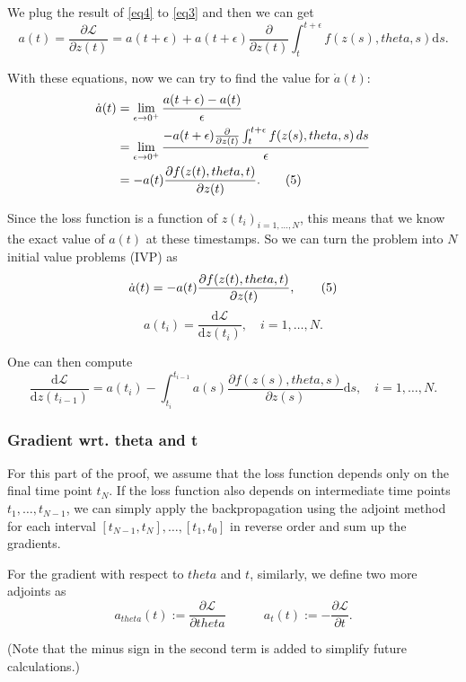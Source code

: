 \documentclass[a4paper,11pt,titlepage]{article}
\def\({}%
\def\){}%
\def\theta{theta}%
\theoremstyle{definition}
\theoremstyle{plain}
\theoremstyle{remark}
\begin{document}
We plug the result of \ref{eq4} to \ref{eq3} and then we can get
$$
a(t)=\frac{\partial \mathcal{L}}{\partial z(t)} = a(t+\epsilon)+a(t+\epsilon)\frac{\partial}{\partial z(t)}\int_{t}^{t+\epsilon}f(z(s),\theta,s)\mathrm{d}s.
$$

With these equations, now we can try to find the value for $\dot{a}(t)$:
\begin{align}
\dot{a}(t) &= \lim_{\epsilon \to 0^{+}}\frac{a(t+\epsilon)-a(t)}{\epsilon}\notag\\
&=\lim_{\epsilon \to 0^{+}}\frac{-a(t+\epsilon)\frac{\partial}{\partial z(t)}\int_{t}^{t+\epsilon}f(z(s),\theta,s)\,ds}{\epsilon}\notag\\
&=-a(t)\frac{\partial f(z(t),\theta,t)}{\partial z(t)}.\tag{5}
\end{align}

Since the loss function is a function of $z(t_i)_{i=1,\dots,N}$, this means that we know the exact value of $a(t)$ at these timestamps. So we can turn the problem into $N$ initial value problems (IVP) as
\begin{equation}{\label{eq5}}
    \dot{a}(t) = -a(t)\frac{\partial f(z(t),\theta,t)}{\partial z(t)},\tag{5}
\end{equation}
$$ a(t_i) = \frac{\mathrm{d}\mathcal{L}}{\mathrm{d}z(t_i)},\quad i=1,\dots,N.
$$

One can then compute
$$
\frac{\mathrm{d}\mathcal{L}}{\mathrm{d}z(t_{i-1})} =a(t_i)- \int_{t_i}^{t_{i-1}}a(s)\frac{\partial f(z(s),\theta,s)}{\partial z(s)}\mathrm{d}s,\quad i=1,\dots,N.
$$

\subsubsection{Gradient wrt. \(\theta\) and \(t\)}

For this part of the proof, we assume that the loss function depends only on the final time point $t_N$. If the loss function also depends on intermediate time points $t_1,\dots,t_{N-1}$, we can simply apply the backpropagation using the adjoint method for each interval $[t_{N-1},t_N],\dots,[t_1,t_0]$ in reverse order and sum up the gradients. 

For the gradient with respect to $\theta$ and $t$, similarly, we define two more adjoints as
$$a_{\theta}(t):=\frac{\partial\mathcal{L}}{\partial \theta}
\quad\quad\quad a_{t}(t):=-\frac{\partial\mathcal{L}}{\partial t}.$$

(Note that the minus sign in the second term is added to simplify future calculations.)
\end{document}
